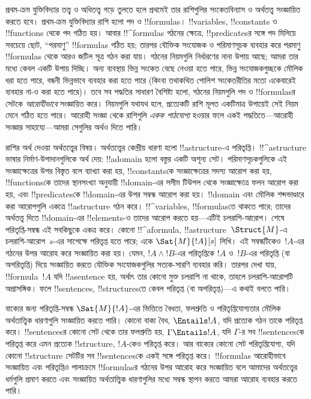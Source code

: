 \documentclass[../../../include/open-logic-section]{subfiles}
\begin{document}


প্রথম-ক্রম যুক্তিবিদ্যার তত্ত্ব ও অধিতত্ত্ব গড়ে তুলতে হলে প্রথমেই তার
রাশিগুলির সংকেতবিন্যাস ও অর্থতত্ত্ব সংজ্ঞায়িত করতে হবে। প্রথম-ক্রম
যুক্তিবিদ্যার রাশি হলো পদ ও !!{formula}s। !!{variable}s,
!!{constant}s ও !!{function}s থেকে পদ গঠিত হয়। আবার !!^{formula}s গঠনের ক্ষেত্রে,
!!{predicate}sর সঙ্গে পদ মিলিয়ে সবচেয়ে ছোট, ``পরমাণু''
!!{formula}s গঠিত হয়; তারপর যৌক্তিক সংযোজক ও পরিমাণসূচক ব্যবহার করে
পরমাণু !!{formula}s থেকে আরও জটিল সূত্র গঠন করা যায়। গঠনের নিয়মগুলি
নির্ধারণের নানা উপায় আছে; আমরা তার মধ্যে কেবল একটি উপায় দিচ্ছি।
অন্য ব্যবস্থায় ভিন্ন সংকেত বেছে নেওয়া হতে পারে, ভিন্ন সংযোজকগুচ্ছকে
মৌলিক ধরা হতে পারে, বন্ধনী ভিন্নভাবে ব্যবহার করা হতে পারে (কিংবা
তথাকথিত পোলিশ সংকেতরীতির মতো একেবারেই ব্যবহার না-ও করা হতে পারে)।
তবে সব পদ্ধতির সাধারণ বৈশিষ্ট্য হলো, গঠনের নিয়মগুলি পদ ও
!!{formula}sর সেটকে \emph{আরোহীভাবে} সংজ্ঞায়িত করে। নিয়মগুলি
যথাযথ হলে, প্রত্যেকটি রাশি মূলত একটিমাত্র উপায়েই সেই নিয়ম মেনে
গঠিত হতে পারে। আরোহী সংজ্ঞা থেকে রাশিগুলি \emph{একক পাঠযোগ্য}
হওয়ার ফলে একই পদ্ধতিতে—আরোহী সংজ্ঞার সাহায্যে—আমরা সেগুলির অর্থও
দিতে পারি।

রাশির অর্থ দেওয়া অর্থতত্ত্বের বিষয়। অর্থতত্ত্বের কেন্দ্রীয় ধারণা
হলো !!a{structure}-এ পরিতৃপ্তি। !!^a{structure} ভাষার
নির্মাণ-উপাদানগুলিকে অর্থ দেয়: !!a{domain} হলো বস্তুর একটি অশূন্য
সেট। পরিমাণসূচকগুলিকে এই সংজ্ঞাক্ষেত্রের উপর বিস্তৃত বলে ব্যাখ্যা
করা হয়, !!{constant}sকে সংজ্ঞাক্ষেত্রের সদস্য আরোপ করা হয়,
!!{function}sকে তাদের স্থানসংখ্যা অনুযায়ী
!!{domain}-এর সসীম টিউপল থেকে সংজ্ঞাক্ষেত্রে ফলন আরোপ করা হয়,
এবং !!{predicate}sকে !!{domain}-এর উপর সম্বন্ধ আরোপ করা হয়।
!!{domain} এবং মৌলিক শব্দভাণ্ডারে করা আরোপগুলি একত্রে
!!a{structure} গঠন করে। !!^{variable}s, !!{formula}sতে থাকতে পারে;
তাদের অর্থতত্ত্ব দিতে !!{domain}-এর !!{element}s-ও তাদের আরোপ করতে
হয়—এটিই চলরাশি-আরোপ। শেষে পরিতৃপ্তি-সম্বন্ধ এই সবকিছুকে একত্র করে।
কোনো !!^a{formula}, !!a{structure}~$\Struct{M}$-এ চলরাশি-আরোপ~$s$-এর
সাপেক্ষে পরিতৃপ্ত হতে পারে; একে $\Sat{M}{!A}[s]$ লিখি। এই
সম্বন্ধটিকেও~$!A$-এর গঠনের উপর আরোহ করে সংজ্ঞায়িত করা হয়। যেমন,
$!A \land !B$-এর পরিতৃপ্তিকে $!A$ ও~$!B$-এর পরিতৃপ্তি (বা
অপরিতৃপ্তি) দিয়ে সংজ্ঞায়িত করতে যৌক্তিক সংযোজকগুলির সত্যক-সারণি
ব্যবহার করি। তারপর দেখা যায়, !!{formula}~$!A$ যদি !!a{sentence}
হয়, অর্থাৎ তার কোনো মুক্ত চলরাশি না থাকে, তাহলে চলরাশি-আরোপটি
অপ্রাসঙ্গিক। ফলে !!{sentence}s, !!{structure}sতে কেবল পরিতৃপ্ত (বা
অপরিতৃপ্ত)—এ কথাই বলতে পারি।

বাক্যের জন্য পরিতৃপ্তি-সম্বন্ধ $\Sat{M}{!A}$-এর ভিত্তিতে
বৈধতা, ফলশ্রুতি ও পরিতৃপ্তিযোগ্যতার মৌলিক অর্থতাত্ত্বিক ধারণাগুলি
সংজ্ঞায়িত করতে পারি। কোনো বাক্য বৈধ, $\Entails !A$, যদি প্রত্যেক
গঠন তাকে পরিতৃপ্ত করে। !!{sentence}sর কোনো সেট থেকে তার ফলশ্রুতি
হয়, $\Gamma \Entails !A$, যদি $\Gamma$-র সব !!{sentence}sকে
পরিতৃপ্ত করে এমন প্রত্যেক !!{structure}, $!A$-কেও পরিতৃপ্ত করে।
আর বাক্যের কোনো সেট পরিতৃপ্তিযোগ্য, যদি কোনো !!{structure} সেটটির সব
!!{sentence}sকে একই সঙ্গে পরিতৃপ্ত করে। !!{formula}s আরোহীভাবে
সংজ্ঞায়িত এবং পরিতৃপ্তিও পালাক্রমে !!{formula}sর গঠনের উপর আরোহ
করে সংজ্ঞায়িত বলে আমাদের অর্থতত্ত্বের ধর্মগুলি প্রমাণ করতে এবং
সংজ্ঞায়িত অর্থতাত্ত্বিক ধারণাগুলির মধ্যে সম্বন্ধ স্থাপন করতে আমরা
আরোহ ব্যবহার করতে পারি।
\end{document}

